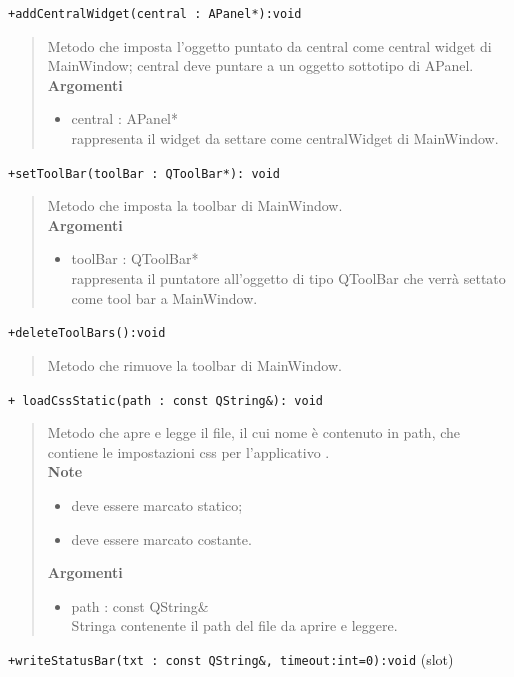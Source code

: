 \color{blue}\verb!+addCentralWidget(central : APanel*):void !
\begin{quote}
\color{black} Metodo che imposta l'oggetto puntato da central come central widget di MainWindow; central deve puntare a un oggetto sottotipo di APanel. \\
\textbf{Argomenti}
\begin{itemize}
\item central : APanel* \\ rappresenta il widget da settare come centralWidget di MainWindow.
\end{itemize}
\end{quote} 
\color{blue}\verb!+setToolBar(toolBar : QToolBar*): void !
\begin{quote}
\color{black}Metodo che imposta la toolbar di MainWindow.\\
\textbf{Argomenti}
\begin{itemize}
\item toolBar : QToolBar* \\ rappresenta il puntatore all'oggetto di tipo QToolBar che verrà settato come tool bar a MainWindow.
\end{itemize}
\end{quote} 
\color{blue}\verb!+deleteToolBars():void !
\begin{quote}
\color{black} Metodo che rimuove la toolbar di MainWindow.
\end{quote} 
\color{blue}\verb!+ loadCssStatic(path : const QString&): void!
\color{black}
\begin{quote}
 Metodo che apre e legge il file, il cui nome è contenuto in path, che contiene le impostazioni css per l'applicativo \project{}. \\ 
 \textbf{Note}
 \begin{itemize}
 \item deve essere marcato statico;
 \item deve essere marcato costante.
 \end{itemize}
\textbf{Argomenti\\}
\begin{itemize}
\item path : const QString\& \\ Stringa contenente il path del file da aprire e leggere.
\end{itemize}
\end{quote} 
\color{blue}\verb!+writeStatusBar(txt : const QString&, timeout:int=0):void! (slot)
